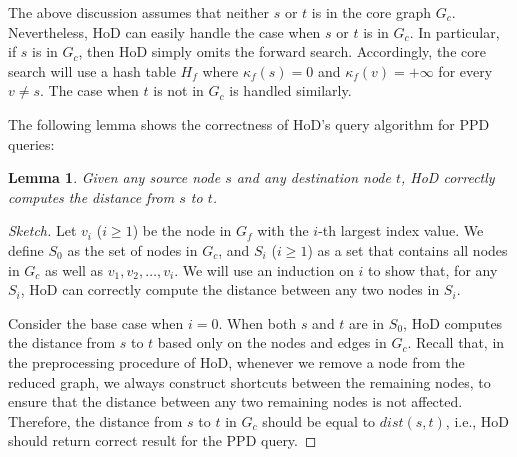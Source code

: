 \documentclass{sig-alternate}
\newtheorem{lemma} {Lemma}
\def\GC{G_c}
\def\d{dist}
\def\HF{H_f}
\def\kf{\kappa_f}
\begin{document}
\begin{sloppy}
The above discussion assumes that neither $s$ or $t$ is in the core graph $\GC$. Nevertheless, HoD can easily handle the case when $s$ or $t$ is in $\GC$. In particular, if $s$ is in $\GC$, then HoD simply omits the forward search. Accordingly, the core search will use a hash table $\HF$ where $\kf(s) = 0$ and $\kf(v) = +\infty$ for every $v \ne s$. The case when $t$ is not in $\GC$ is handled similarly.

The following lemma shows the correctness of HoD's query algorithm for PPD queries:
\begin{lemma} \label{lmm:p2p-correct}
Given any source node $s$ and any destination node $t$, HoD correctly computes the distance from $s$ to $t$.
\end{lemma}
\begin{proof}[Sketch]
Let $v_i$ ($i \ge 1$) be the node in $G_f$ with the $i$-th largest index value. We define $S_0$ as the set of nodes in $\GC$, and $S_i$ ($i \ge 1$) as a set that contains all nodes in $\GC$ as well as $v_1, v_2, \ldots, v_i$. We will use an induction on $i$ to show that, for any $S_i$, HoD can correctly compute the distance between any two nodes in $S_i$.

Consider the base case when $i = 0$. When both $s$ and $t$ are in $S_0$, HoD computes the distance from $s$ to $t$ based only on the nodes and edges in $\GC$. Recall that, in the preprocessing procedure of HoD, whenever we remove a node from the reduced graph, we always construct shortcuts between the remaining nodes, to ensure that the distance between any two remaining nodes is not affected. Therefore, the distance from $s$ to $t$ in $\GC$ should be equal to $\d(s, t)$, i.e., HoD should return correct result for the PPD query.


\end{proof}
\end{sloppy}
\end{document}
